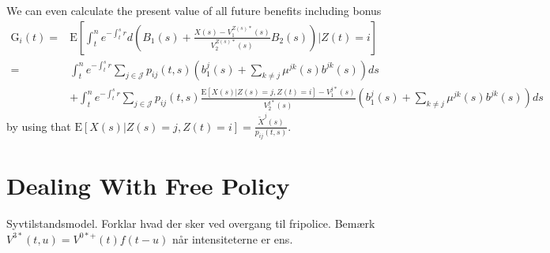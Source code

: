 \documentclass[12pt]{article}
\newcommand{\E}{\text{E}}
\theoremstyle{my_thm}
\begin{document}
We can even calculate the present value of all future benefits including bonus
\begin{align*}
\text{G}_i(t)=&\E \left[ \int_t^n e^{-\int_t^s r} d \left( B_1(s)+\frac{X(s)-V_1^{Z(s)*}(s)}{V_2^{Z(s)*}(s)}B_2(s) \right) \big|Z(t)=i \right]
\\
=&
\int_t^n e^{-\int_t^s r} \sum_{j \in \mathcal{J}} p_{ij}(t,s) \left( b_1^j(s)+ \sum_{k\neq j} \mu^{jk}(s) b^{jk}(s)  \right) ds
\\
&+
\int_t^n e^{-\int_t^s r} \sum_{j \in \mathcal{J}} p_{ij}(t,s) \frac{\E[X(s)|Z(s)=j,Z(t)=i]-V_1^{j*}(s)}{V_2^{j*}(s)}\left( b_1^j(s)+ \sum_{k\neq j} \mu^{jk}(s) b^{jk}(s)  \right) ds
\end{align*}
by using that $\E[X(s)|Z(s)=j,Z(t)=i]=\frac{\tilde{X}^j(s)}{p_{ij}(t,s)}$.
\newpage

\iffalse
\section{Dealing With Free Policy}
Syvtilstandsmodel. Forklar hvad der sker ved overgang til fripolice. Bemærk $V^{3*}(t,u)=V^{0*+}(t)f(t-u)$ når intensiteterne er ens.\\
\end{document}
